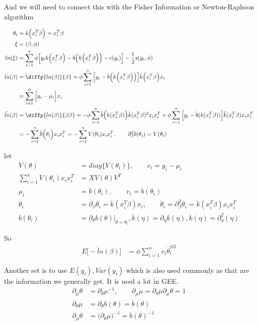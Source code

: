 And we will need to connect this with the Fisher Information or Newton-Raphson algorithm

\begin{align*}
\theta_i & = k \Big(x_i^{T} \beta \Big) = x_i^{T} \beta \\
\xi &= (\beta, \phi)\\
ln(\xi) &= \sum_{i=1}^n \phi \Big[ y_i k \Big(x_i^{T} \beta \Big) - b \Big( k \Big(x_i^{T} \beta \Big)  \Big) - c(y_i) \Big] - \frac{1}{2} s(y_i, \phi) \\
\dot{ln}(\beta) &= \diffp{ln(\beta) }{\beta} = \phi \sum_{i=1}^n \Big[ y_i - \dot{b} \Big( k \Big(x_i^{T} \beta \Big)  \Big)  \Big] \dot{k} \Big(x_i^{T} \beta \Big) x_i \\
&= \sum_{i=1}^n \Big[ y_i - \mu_i \Big] x_i \\
\ddot{ln}(\beta) &= \diffp{ln(\beta) }{\beta \beta} = -\phi \sum_{i=1}^n \ddot{b} \Big( k(x_i^T \beta) \Big) \dot{k}(x_i^T \beta)^2 x_i x_i^T + \phi \sum_{i=1}^n \Big[y_i - \dot{b}(k(x_i^T \beta)) \Big] \ddot{k}(x_i^T \beta) x_i x_i^T \\
&= -\sum_{i=1}^n \ddot{b} \Big(\theta_i \Big) x_i x_i^T = -\sum_{i=1}^n V(\theta_i) x_i x_i^T, \qquad \partial^2_{\beta}{{b(\theta_i)}} = V(\theta_i)
\end{align*}

let 
\begin{align*}
V(\theta) & = diag \{ V(\theta_i) \} , \qquad e_i = y_i - \mu_i\\
\sum_{i=1}^n V(\theta_i) x_i x_i^T &= X V(\theta) V^T\\
\mu_i &= \dot{b}(\theta_i), \qquad v_i = \ddot{b}(\theta_i)\\
\dot{\theta}_i &= \partial_{\beta} \theta_i = \dot{k}(x_i^T \beta) x_i, \qquad \ddot{\theta}_i = \partial^2_{\beta} \theta_i = \ddot{k}(x_i^T \beta) x_i x_i^T \\
\dot{b}(\theta_i) &= \partial_{\theta} b(\theta) \Big |_{\theta = \theta_i}, \dot{k}(\eta) = \partial_{\eta} k(\eta), \ddot{k}(\eta) = \partial^2_{\eta}(\eta)
\end{align*}

So
\begin{align*}
E \Big[ - \ddot{l}n(\beta) \Big] & = \phi \sum_{i=1}^n v_i \dot{\theta}_i^{\otimes 2}
\end{align*}

Another set is to use $E(y_i), Var(y_i)$ which is also used commonly as that are the information we generally get. It is used a lot in GEE. 
\begin{align*}
\partial_{\mu} \theta &= \partial_{\theta} \mu ^{-1}, \qquad \partial_{\mu} \mu = \partial_{\theta} \mu \partial_{\mu} \theta = 1\\
\partial_{\theta} \mu &= \partial_{\theta} b(\theta) = \ddot{b}(\theta) \\
\partial_{\mu} \theta &= \Big( \partial_{\theta} \mu \Big)^{-1} =  \ddot{b}(\theta)^{-1} \\
\end{align*}

